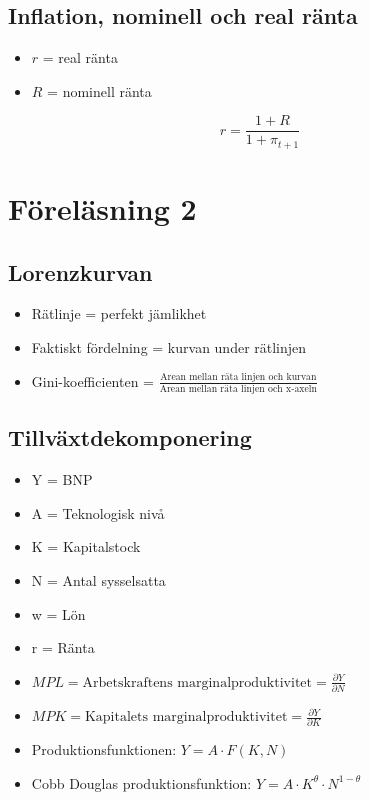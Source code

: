 \documentclass[12pt,a4paper]{article}
\begin{document}
\subsection*{Inflation, nominell och real ränta}
\begin{itemize}
    \item $r$ = real ränta
    \item $R$ = nominell ränta
\end{itemize}

$$r = \frac{1+R}{1+\pi_{t+1}}$$

\section*{Föreläsning 2}
\subsection*{Lorenzkurvan}
\begin{itemize}
    \item Rätlinje = perfekt jämlikhet
    \item Faktiskt fördelning = kurvan under rätlinjen
    \item Gini-koefficienten = $\frac{\text{Arean mellan räta linjen och kurvan}}{\text{Arean mellan räta linjen och x-axeln}}$
\end{itemize}

\subsection*{Tillväxtdekomponering}
\begin{itemize}
    \item Y = BNP
    \item A = Teknologisk nivå
    \item K = Kapitalstock
    \item N = Antal sysselsatta
    \item w = Lön
    \item r = Ränta
    \item $MPL = \text{Arbetskraftens marginalproduktivitet} = \frac{\partial Y}{\partial N}$
    \item $MPK = \text{Kapitalets marginalproduktivitet} = \frac{\partial Y}{\partial K}$
    \item Produktionsfunktionen: $Y = A \cdot F(K, N)$
    \item Cobb Douglas produktionsfunktion: $Y = A \cdot K^\theta \cdot N^{1-\theta}$
\end{itemize}
\end{document}
